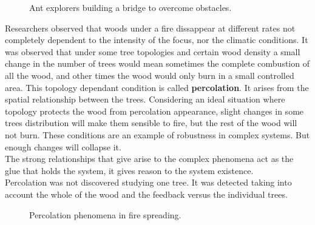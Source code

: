 \documentclass[11pt,oneside,a4paper,openright]{report}
\begin{document}
\begin{figure}[h]
\centering
\setlength\fboxsep{0pt}
\setlength\fboxrule{0.5pt}
\caption{ Ant explorers building a bridge to overcome obstacles.}
\label{fig:ants_1}
\end{figure}



Researchers observed that woods under a fire dissappear at different rates not completely dependent to the intensity
of the focus, nor the climatic conditions. It was observed that under some tree topologies and certain wood
density a small change in the number of trees would mean sometimes the complete combustion of all the wood, and
other times the wood would only burn in a small controlled area. This topology dependant condition is called
\textbf{percolation}. It arises from the spatial relationship between the trees. Considering an ideal situation
where topology protects the wood from percolation appearance, slight changes in some trees distribution will make
them sensible to fire, but the rest of the wood will not burn. These conditions are an example of robustness
in complex systems. But enough changes will collapse it.\\
The strong relationships that give arise to the complex phenomena act as the glue that holds the system, it gives
reason to the system existence.\\ 
Percolation was not discovered studying one tree. It was detected taking into account the whole of the wood and the feedback versus the individual trees.\\

\begin{figure}[h!]
\centering
\setlength\fboxsep{0pt}
\setlength\fboxrule{0.5pt}
\caption{ Percolation phenomena in fire spreading.}
\label{fig:percolation_1}
\end{figure}
\end{document}

